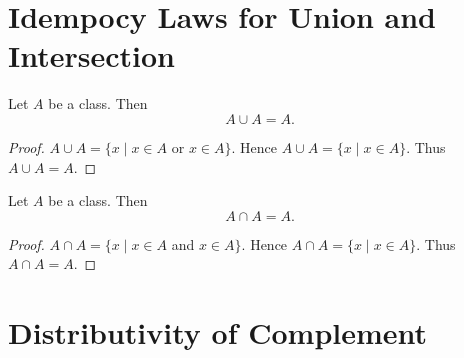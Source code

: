 \documentclass[10pt]{article}
\begin{document}
  \section{Idempocy Laws for Union and Intersection}

  \begin{forthel}
    \begin{proposition}
      Let $A$ be a class.
      Then \[ A \cup A = A. \]
    \end{proposition}
    \begin{proof}
      $A \cup A = \{x \mid x \in A$ or $x \in A \}$.
      Hence $A \cup A = \{ x \mid x \in A \}$.
      Thus $A \cup A = A$.
    \end{proof}
  \end{forthel}

  \begin{forthel}
    \begin{proposition}
      Let $A$ be a class.
      Then \[ A \cap A = A. \]
    \end{proposition}
    \begin{proof}
      $A \cap A = \{ x \mid x \in A$ and $x \in A \}$.
      Hence $A \cap A = \{ x \mid x \in A \}$.
      Thus $A \cap A = A$.
    \end{proof}
  \end{forthel}


  \section{Distributivity of Complement}
\end{document}

